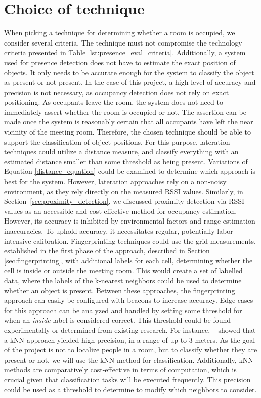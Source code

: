 \section{Choice of technique}\label{sec:ChoiceOfTechnique}
When picking a technique for determining whether a room is occupied, we consider several criteria.
The technique must not compromise the technology criteria presented in Table \ref{lst:presence_eval_criteria}.
Additionally, a system used for presence detection does not have to estimate the exact position of objects.
It only needs to be accurate enough for the system to classify the object as present or not present.
In the case of this project, a high level of accuracy and precision is not necessary, as occupancy detection does not rely on exact positioning.
As occupants leave the room, the system does not need to immediately assert whether the room is occupied or not.
The assertion can be made once the system is reasonably certain that all occupants have left the near vicinity of the meeting room.
Therefore, the chosen technique should be able to support the classification of object positions.  
For this purpose, lateration techniques could utilize a distance measure, and classify everything with an estimated distance smaller than some threshold as being present.
Variations of Equation \ref{distance_equation} could be examined to determine which approach is best for the system.
However, lateration approaches rely on a non-noisy environment, as they rely directly on the measured RSSI values.
Similarly, in Section~\ref{sec:proximity_detection}, we discussed proximity detection via RSSI values as an accessible and cost-effective method for occupancy estimation. However, its accuracy is inhibited by environmental factors and range estimation inaccuracies. To uphold accuracy, it necessitates regular, potentially labor-intensive calibration.
Fingerprinting techniques could use the grid measurements, established in the first phase of the approach, described in Section \ref{sec:fingerprinting}, with additional labels for each cell, determining whether the cell is inside or outside the meeting room.
This would create a set of labelled data, where the labels of the k-nearest neighbors could be used to determine whether an object is present. 
Between these approaches, the fingerprinting approach can easily be configured with beacons to increase accuracy.
Edge cases for this approach can be analyzed and handled by setting some threshold for when an \textit{inside} label is considered correct. 
This threshold could be found experimentally or determined from existing research. 
For instance, \citeauthor{ble_kneares_neural}~\cite{ble_kneares_neural} showed that a kNN approach yielded high precision, in a range of up to 3 meters.
As the goal of the project is not to localize people in a room, but to classify whether they are present or not, we will use the kNN method for classification.
Additionally, kNN methods are comparatively cost-effective in terms of computation, which is crucial given that classification tasks will be executed frequently.
This precision could be used as a threshold to determine to modify which neighbors to consider.    

